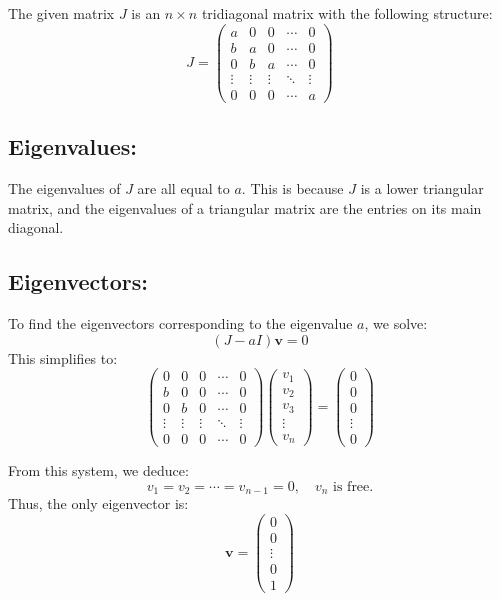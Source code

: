 \documentclass{article}
\begin{document}
The given matrix \( J \) is an \( n \times n \) tridiagonal matrix with the following structure:
\[
J = \begin{pmatrix}
a & 0 & 0 & \cdots & 0 \\
b & a & 0 & \cdots & 0 \\
0 & b & a & \cdots & 0 \\
\vdots & \vdots & \vdots & \ddots & \vdots \\
0 & 0 & 0 & \cdots & a
\end{pmatrix}
\]

\subsection*{Eigenvalues:}
The eigenvalues of \( J \) are all equal to \( a \). This is because \( J \) is a lower triangular matrix, and the eigenvalues of a triangular matrix are the entries on its main diagonal.

\subsection*{Eigenvectors:}
To find the eigenvectors corresponding to the eigenvalue \( a \), we solve:
\[
(J - a I) \mathbf{v} = 0
\]
This simplifies to:
\[
\begin{pmatrix}
0 & 0 & 0 & \cdots & 0 \\
b & 0 & 0 & \cdots & 0 \\
0 & b & 0 & \cdots & 0 \\
\vdots & \vdots & \vdots & \ddots & \vdots \\
0 & 0 & 0 & \cdots & 0
\end{pmatrix}
\begin{pmatrix}
v_1 \\
v_2 \\
v_3 \\
\vdots \\
v_n
\end{pmatrix}
=
\begin{pmatrix}
0 \\
0 \\
0 \\
\vdots \\
0
\end{pmatrix}
\]

From this system, we deduce:
\[
v_1 = v_2 = \cdots = v_{n-1} = 0, \quad v_n \text{ is free.}
\]
Thus, the only eigenvector is:
\[
\mathbf{v} = \begin{pmatrix}
0 \\
0 \\
\vdots \\
0 \\
1
\end{pmatrix}
\]
\end{document}
